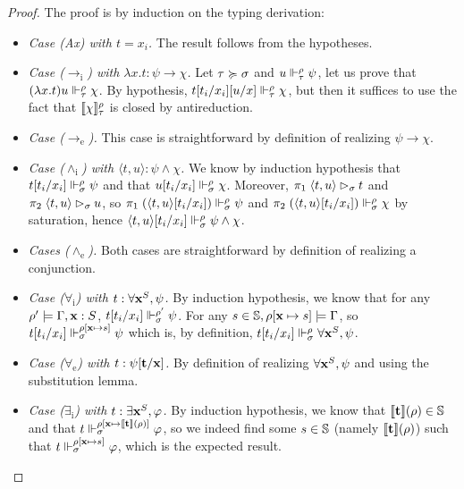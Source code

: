 \documentclass[a4paper,UKenglish,cleveref, autoref, thm-restate]{lipics-v2021}
\newcommand{\todo}[1]{\textcolor{red}{TODO: #1}}
\begin{document}
\begin{proof}
 The proof is by induction on the typing derivation:%
 \newcommand{\case}[2]{\emph{Case \emph{(#1)} with #2.}}
 \newcommand{\Case}[1]{\emph{Case \emph{(#1)}.}}
 \newcommand{\Cases}[1]{\emph{Cases \emph{(#1)}.}}
  \begin{itemize}
  \item \case{Ax}{$t = x_i$} The result follows from the hypotheses.
  \item \case{$\to_\mathrm i$}{$\lambda x.t : \psi \to \chi$}
  Let $\tau \succcurlyeq\sigma$ and $u \Vdash_{\tau}^{\rho} \psi$, let us prove that $(\lambda x.t)u \Vdash_{\tau}^{\rho} \chi$. By hypothesis, $t[t_i/x_i][u/x] \Vdash_{\tau}^{\rho} \chi$, but then it suffices to use the fact that $\llbracket \chi \rrbracket^{\rho}_{\tau}$ is closed by antireduction.
  \item \Case{$\to_\mathrm e$} This case is straightforward by definition of realizing $\psi \to \chi$.
  \item \case{$\land_\mathrm i$}{$\langle t,u \rangle : \psi \land \chi$}
  We know by induction hypothesis that $t[t_i/x_i] \Vdash_{\sigma}^{\rho} \psi$ and that $u[t_i/x_i] \Vdash_{\sigma}^{\rho} \chi$. Moreover, $\pi_1\; \langle t,u \rangle \rhd_{\sigma} t$ and $\pi_2\;\langle t,u \rangle \rhd_{\sigma} u$, so $\pi_1\;(\langle t,u\rangle[t_i/x_i]) \Vdash_{\sigma}^{\rho}\psi$ and $\pi_2\;(\langle t,u\rangle[t_i/x_i]) \Vdash_{\sigma}^{\rho} \chi$ by saturation, hence $\langle t,u\rangle [t_i/x_i] \Vdash_{\sigma}^{\rho} \psi\land \chi$.
  \item \Cases{$\land_\mathrm e$}
  Both cases are straightforward by definition of realizing a conjunction.
  \item \case{$\forall_\mathrm i$}{$t : \forall \mathbf{x}^S, \psi$}
  By induction hypothesis, we know that for any $\rho' \models \Gamma, \mathbf{x} : S$, $t[t_i/x_i] \Vdash_{\sigma}^{\rho'} \psi$. For any $s \in \mathbb S, \rho[\mathbf{x} \mapsto s] \models \Gamma$, so $t[t_i/x_i] \Vdash_{\sigma}^{\rho[\mathbf{x}\mapsto s]} \psi$ which is, by definition, $t[t_i/x_i] \Vdash_{\sigma}^{\rho} \forall \mathbf{x}^S,\psi$.
  \item \case{$\forall_\mathrm e$}{$t : \psi[\mathbf{t}/\mathbf{x}]$}
  By definition of realizing $\forall \mathbf{x}^S, \psi$ and using the substitution lemma.
  \item \case{$\exists_\mathrm i$}{$t : \exists \mathbf{x}^S, \varphi$}
  By induction hypothesis, we know that $\llbracket \mathbf{t} \rrbracket(\rho) \in \mathbb S$ and that $t \Vdash_{\sigma}^{\rho[\mathbf{x} \mapsto \llbracket \mathbf{t} \rrbracket(\rho)]} \varphi$, so we indeed find some $s \in \mathbb S$ (namely $\llbracket \mathbf{t} \rrbracket(\rho)$) such that $t \Vdash_{\sigma}^{\rho[\mathbf{x}\mapsto s]}\varphi$, which is the expected result.

\end{itemize}
\end{proof}
\end{document}
